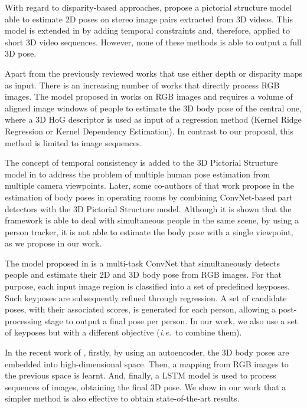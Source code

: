 \documentclass[review,12pt,3p]{elsarticle}
\def \ie{\textit{i.e.}}
\begin{document}
With regard to disparity-based approaches, \citep{LopezQuintero2016} propose a pictorial structure model able to estimate 2D poses on stereo image pairs extracted from 3D videos. This model is extended in \citep{LopezQuintero2017} by adding temporal constraints and, therefore, applied to short 3D video sequences. However, none of these methods is able to output a full 3D pose.

Apart from the previously reviewed works that use either depth or disparity maps as input. There is an increasing number of works that directly process RGB images.
The model proposed in \cite{tekin2015arxiv} works on RGB images and requires a volume of aligned image windows of people to estimate the 3D body pose of the central one, where a 3D HoG descriptor is used as input of a regression method (Kernel Ridge Regression or Kernel Dependency Estimation). In contrast to our proposal, this method is limited to image sequences.


The concept of temporal consistency is added to the 3D Pictorial Structure model in \cite{belagiannis2014weccv} to address the problem of
multiple human pose estimation from multiple camera viewpoints. Later, some co-authors of that work propose in \cite{belagiannis2016mva} the estimation of body poses in operating rooms by combining ConvNet-based part detectors with the 3D Pictorial Structure model.
Although it is shown that the framework is able to deal with simultaneous people in the same scene, by using a person tracker, it is not able to estimate the body pose with a single viewpoint, as we propose in our work.

The model proposed in \cite{rogez2017lcr} is a multi-task ConvNet that simultaneously detects people and estimate their 2D and 3D body pose from RGB images. For that purpose, each input image region is classified into a set of predefined keyposes. Such keyposes are subsequently refined through regression. A set of candidate poses, with their associated scores, is generated for each person, allowing a post-processing stage to output a final pose per person. 
In our work, we also use a set of keyposes but with a different objective (\ie~to combine them).

In the recent work of \cite{katircioglu2018ijcv}, firstly, by using an autoencoder, the 3D body poses are embedded into high-dimensional space. Then, a mapping from RGB images to the previous space is learnt. And, finally, a LSTM model is used to process sequences of images, obtaining the final 3D pose.
We show in our work that a simpler method is also effective to obtain state-of-the-art results.
\end{document}
